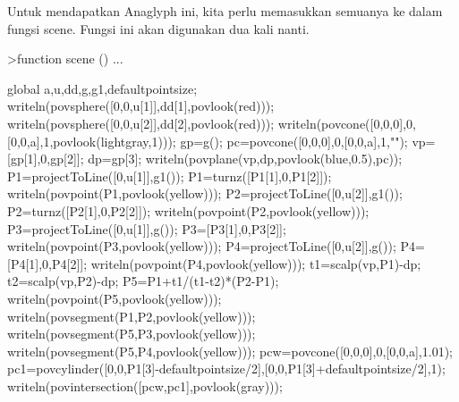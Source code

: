 \documentclass[a4paper,10pt]{article}
\begin{document}
\begin{eulernotebook}
\begin{eulercomment}
\begin{eulercomment}
\begin{eulercomment}
\begin{eulercomment}
\begin{eulercomment}
\begin{eulercomment}
\begin{eulercomment}
\begin{eulercomment}
\begin{eulercomment}
\begin{eulercomment}
\begin{eulercomment}
\begin{eulercomment}
\begin{eulercomment}
\begin{eulercomment}
\begin{eulercomment}
\begin{eulercomment}
\begin{eulercomment}
\begin{eulercomment}
\begin{eulercomment}
\begin{eulercomment}
\begin{eulercomment}
\begin{eulercomment}
\begin{eulercomment}
\begin{eulercomment}
\begin{eulercomment}
\begin{eulercomment}
\begin{eulercomment}
\begin{eulercomment}
\begin{eulercomment}
\begin{eulercomment}
\begin{eulercomment}
\begin{eulercomment}
\begin{eulercomment}
\begin{eulercomment}
\begin{eulercomment}
\begin{eulercomment}
\begin{eulercomment}
\begin{eulercomment}
\begin{eulercomment}
\begin{eulercomment}
\begin{eulercomment}
\begin{eulercomment}
\begin{eulercomment}
Untuk mendapatkan Anaglyph ini, kita perlu memasukkan semuanya ke
dalam fungsi scene. Fungsi ini akan digunakan dua kali nanti.
\end{eulercomment}
\begin{eulerprompt}
>function scene () ...
\end{eulerprompt}
\begin{eulerudf}
  global a,u,dd,g,g1,defaultpointsize;
  writeln(povsphere([0,0,u[1]],dd[1],povlook(red)));
  writeln(povsphere([0,0,u[2]],dd[2],povlook(red)));
  writeln(povcone([0,0,0],0,[0,0,a],1,povlook(lightgray,1)));
  gp=g();
  pc=povcone([0,0,0],0,[0,0,a],1,"");
  vp=[gp[1],0,gp[2]]; dp=gp[3];
  writeln(povplane(vp,dp,povlook(blue,0.5),pc));
  P1=projectToLine([0,u[1]],g1()); P1=turnz([P1[1],0,P1[2]]);
  writeln(povpoint(P1,povlook(yellow)));
  P2=projectToLine([0,u[2]],g1()); P2=turnz([P2[1],0,P2[2]]);
  writeln(povpoint(P2,povlook(yellow)));
  P3=projectToLine([0,u[1]],g()); P3=[P3[1],0,P3[2]];
  writeln(povpoint(P3,povlook(yellow)));
  P4=projectToLine([0,u[2]],g()); P4=[P4[1],0,P4[2]];
  writeln(povpoint(P4,povlook(yellow)));
  t1=scalp(vp,P1)-dp; t2=scalp(vp,P2)-dp; P5=P1+t1/(t1-t2)*(P2-P1);
  writeln(povpoint(P5,povlook(yellow)));
  writeln(povsegment(P1,P2,povlook(yellow)));
  writeln(povsegment(P5,P3,povlook(yellow)));
  writeln(povsegment(P5,P4,povlook(yellow)));
  pcw=povcone([0,0,0],0,[0,0,a],1.01);
  pc1=povcylinder([0,0,P1[3]-defaultpointsize/2],[0,0,P1[3]+defaultpointsize/2],1);
  writeln(povintersection([pcw,pc1],povlook(gray)));

\end{eulerudf}
\end{eulercomment}
\end{eulercomment}
\end{eulercomment}
\end{eulercomment}
\end{eulercomment}
\end{eulercomment}
\end{eulercomment}
\end{eulercomment}
\end{eulercomment}
\end{eulercomment}
\end{eulercomment}
\end{eulercomment}
\end{eulercomment}
\end{eulercomment}
\end{eulercomment}
\end{eulercomment}
\end{eulercomment}
\end{eulercomment}
\end{eulercomment}
\end{eulercomment}
\end{eulercomment}
\end{eulercomment}
\end{eulercomment}
\end{eulercomment}
\end{eulercomment}
\end{eulercomment}
\end{eulercomment}
\end{eulercomment}
\end{eulercomment}
\end{eulercomment}
\end{eulercomment}
\end{eulercomment}
\end{eulercomment}
\end{eulercomment}
\end{eulercomment}
\end{eulercomment}
\end{eulercomment}
\end{eulercomment}
\end{eulercomment}
\end{eulercomment}
\end{eulercomment}
\end{eulercomment}
\end{eulernotebook}
\end{document}
